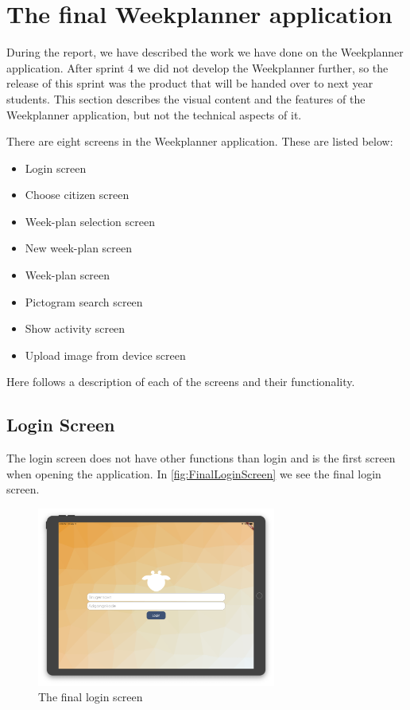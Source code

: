 \section{The final Weekplanner application}

During the report, we have described the work we have done on the Weekplanner application. After sprint 4 we did not develop the Weekplanner further, so the release of this sprint was the product that will be handed over to next year students. This section describes the visual content and the features of the Weekplanner application, but not the technical aspects of it.

There are eight screens in the Weekplanner application. These are listed below:

\begin{itemize}
    \item Login screen
    \item Choose citizen screen
    \item Week-plan selection screen
    \item New week-plan screen
    \item Week-plan screen
    \item Pictogram search screen
    \item Show activity screen
    \item Upload image from device screen
\end{itemize}

Here follows a description of each of the screens and their functionality.

\subsection{Login Screen}

The login screen does not have other functions than login and is the first screen when opening the application. In \autoref{fig:FinalLoginScreen} we see the final login screen.

\begin{figure}[H]
    \begin{center}
        \includegraphics[width=0.7\textwidth]{figures/FinalScreen/loginScreen.png}
    \end{center}
    \caption{The final login screen}
    \label{fig:FinalLoginScreen}
\end{figure}

